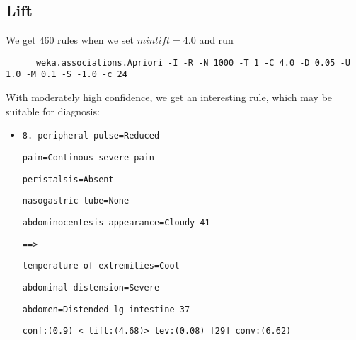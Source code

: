 \subsection{Lift}
We get 460 rules when we set $minlift = 4.0$ and run
\begin{verbatim}
	  weka.associations.Apriori -I -R -N 1000 -T 1 -C 4.0 -D 0.05 -U 1.0 -M 0.1 -S -1.0 -c 24
\end{verbatim}
With moderately high confidence, we get an interesting rule, which may be suitable for diagnosis:
\begin{itemize}
\item   \verb|8. peripheral pulse=Reduced|

\verb|pain=Continous severe pain| 

\verb|peristalsis=Absent| 

\verb|nasogastric tube=None| 

\verb|abdominocentesis appearance=Cloudy 41 |


\verb|==>| 


\verb|temperature of extremities=Cool| 

\verb|abdominal distension=Severe |

\verb|abdomen=Distended lg intestine 37 | 
  
\verb|conf:(0.9) < lift:(4.68)> lev:(0.08) [29] conv:(6.62)|

\end{itemize}




